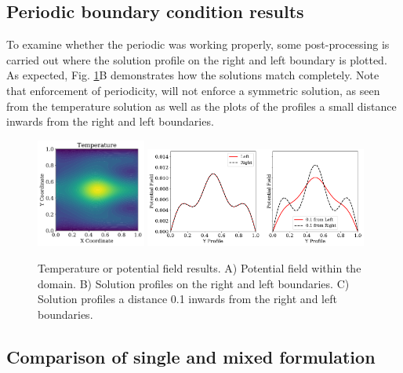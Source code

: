 \documentclass[12pt,3p]{article}
\begin{document}
\subsection{Periodic boundary condition results}
\vspace{-1ex}
To examine whether the periodic  was working properly, some post-processing is carried out where the solution profile on the right  and left boundary is plotted. As expected, Fig. \ref{FigPeriodicSolProfile}B demonstrates how the solutions match completely. Note that enforcement of periodicity, will not enforce a symmetric solution, as seen from the temperature solution as well as the plots of the profiles a small distance inwards from the right and left boundaries. 
\begin{figure}[!htb]
\centering
\includegraphics[width=0.32\textwidth]{./Images/Periodic/PeriodicTemp}
\includegraphics[width=0.65\textwidth]{./Images/Periodic/PeriodicSolProfile}
\caption{ Temperature or potential field results. A) Potential field within the domain. B) Solution profiles on the right and left boundaries. C) Solution profiles a distance 0.1 inwards from the right and left boundaries.  }
\label{FigPeriodicSolProfile}
\end{figure}

\clearpage

\subsection{Comparison of single and mixed formulation}
\vspace{-1ex}
\end{document}
